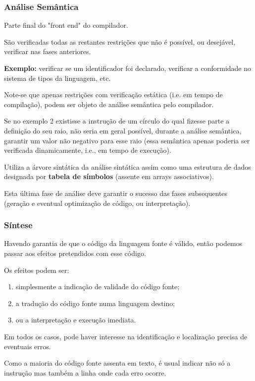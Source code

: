 \documentclass{article}
\begin{document}
\subsubsection{Análise Semântica}

\begin{flushleft}
  \item Parte final do "front end" do compilador.
  \item São verificadas todas as restantes restrições que não é possível, ou desejável, verificar nas fases anteriores.
  \item \textbf{Exemplo:} verificar se um identificador foi declarado,
  verificar a conformidade no sistema de tipos da
  linguagem, etc.
  \item Note-se que apenas restrições com verificação estática
  (i.e. em tempo de compilação), podem ser objeto de
  análise semântica pelo compilador.
  \item Se no exemplo 2 existisse a instrução de um círculo do
  qual fizesse parte a definição do seu raio, não seria em
  geral possível, durante a análise semântica, garantir um
  valor não negativo para esse raio (essa semântica apenas
  poderia ser verificada dinamicamente, i.e., em tempo de
  execução).
  \item Utiliza a árvore sintática da análise sintática assim
  como uma estrutura de dados designada por \textbf{tabela de
  símbolos} (assente em arrays associativos).
  \item Esta última fase de análise deve garantir o sucesso das
  fases subsequentes (geração e eventual optimização de
  código, ou interpretação).
\end{flushleft}

\subsubsection{Síntese}

\begin{flushleft}
  \item Havendo garantia de que o código da linguagem fonte é
  válido, então podemos passar aos efeitos pretendidos
  com esse código.
  \item Os efeitos podem ser:
  \begin{enumerate}
    \item simplesmente a indicação de validade do código fonte;
    \item a tradução do código fonte numa linguagem destino;
    \item ou a interpretação e execução imediata.
  \end{enumerate}
  \item Em todos os casos, pode haver interesse na identificação
  e localização precisa de eventuais erros.
  \item Como a maioria do código fonte assenta em texto, é usual
  indicar não só a instrução mas também a linha onde cada
  erro ocorre.
\end{flushleft}
\end{document}
